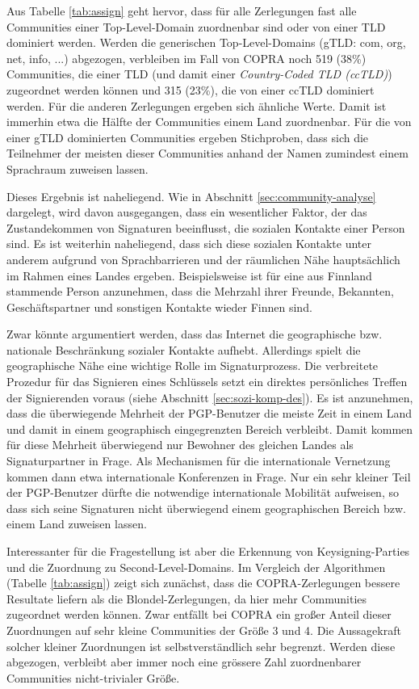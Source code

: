 Aus Tabelle \ref{tab:assign} geht hervor, dass für alle Zerlegungen
fast alle Communities einer Top-Level-Domain zuordnenbar sind oder von
einer TLD dominiert werden. Werden die generischen Top-Level-Domains
(gTLD: com, org, net, info, ...) abgezogen, verbleiben im Fall von COPRA
noch 519 (38\%) Communities, die einer TLD (und damit einer
\emph{Country-Coded TLD (ccTLD)}) zugeordnet werden können und 315
(23\%), die von einer ccTLD dominiert werden. Für die anderen
Zerlegungen ergeben sich ähnliche Werte. Damit ist immerhin etwa die
Hälfte der Communities einem Land zuordnenbar. Für die von einer
gTLD dominierten Communities ergeben Stichproben, dass sich die
Teilnehmer der meisten dieser Communities anhand der Namen zumindest
einem Sprachraum zuweisen lassen.

Dieses Ergebnis ist naheliegend. Wie in Abschnitt
\ref{sec:community-analyse} dargelegt, wird davon ausgegangen, dass
ein wesentlicher Faktor, der das Zustandekommen von Signaturen
beeinflusst, die sozialen Kontakte einer Person sind. Es ist weiterhin
naheliegend, dass sich diese sozialen Kontakte unter anderem aufgrund
von Sprachbarrieren und der räumlichen Nähe hauptsächlich im
Rahmen eines Landes ergeben. Beispielsweise ist für eine aus
Finnland stammende Person anzunehmen, dass die Mehrzahl ihrer Freunde,
Bekannten, Geschäftspartner und sonstigen Kontakte wieder Finnen
sind.

Zwar könnte argumentiert werden, dass das Internet die geographische
bzw. nationale Beschränkung sozialer Kontakte aufhebt. Allerdings
spielt die geographische Nähe eine wichtige Rolle im
Signaturprozess. Die verbreitete Prozedur für das Signieren eines
Schlüssels setzt ein direktes persönliches Treffen der
Signierenden voraus (siehe Abschnitt \ref{sec:sozi-komp-des}). Es ist
anzunehmen, dass die überwiegende Mehrheit der PGP-Benutzer die
meiste Zeit in einem Land und damit in einem geographisch
eingegrenzten Bereich verbleibt. Damit kommen für diese Mehrheit
überwiegend nur Bewohner des gleichen Landes als Signaturpartner in
Frage. Als Mechanismen für die internationale Vernetzung kommen dann
etwa internationale Konferenzen in Frage. Nur ein sehr kleiner Teil
der PGP-Benutzer dürfte die notwendige internationale Mobilität
aufweisen, so dass sich seine Signaturen nicht überwiegend einem
geographischen Bereich bzw. einem Land zuweisen lassen.

Interessanter für die Fragestellung ist aber die Erkennung von
Keysigning-Parties und die Zuordnung zu Second-Level-Domains. Im
Vergleich der Algorithmen (Tabelle \ref{tab:assign}) zeigt sich
zunächst, dass die COPRA-Zerlegungen bessere Resultate liefern als
die Blondel-Zerlegungen, da hier mehr Communities zugeordnet werden
können. Zwar entfällt bei COPRA ein großer Anteil dieser
Zuordnungen auf sehr kleine Communities der Größe 3 und 4. Die
Aussagekraft solcher kleiner Zuordnungen ist selbstverständlich sehr
begrenzt. Werden diese abgezogen, verbleibt aber immer noch eine
grössere Zahl zuordnenbarer Communities nicht-trivialer Größe. 

